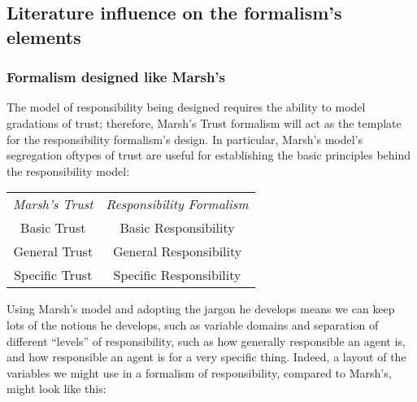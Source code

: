 \subsection{Literature influence on the formalism's elements}
\subsubsection{Formalism designed like Marsh's}
The model of responsibility being designed requires the ability to model gradations of trust; therefore, Marsh's Trust formalism will act as the template for the responsibility formalism's design. In particular, Marsh's model's segregation oftypes of trust are useful for establishing the basic principles behind the responsibility model:

{\centering
\begin{tabular}{c|c}
    \emph{Marsh's Trust} & \emph{Responsibility Formalism}\\
    Basic Trust & Basic Responsibility\\
    General Trust & General Responsibility\\
    Specific Trust & Specific Responsibility\\
\end{tabular}
    }

Using Marsh's model and adopting the jargon he develops means we can keep lots of the notions he develops, such as variable domains and separation of different ``levels'' of responsibility, such as how generally responsible an agent is, and how responsible an agent is for a very specific thing. Indeed, a layout of the variables we might use in a formalism of responsibility, compared to Marsh's, might look like this:

